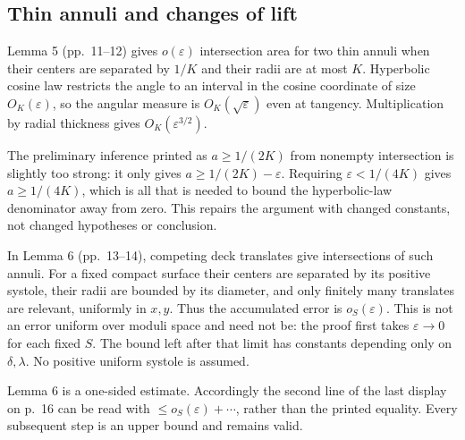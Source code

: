 \documentclass[10pt]{article}
\begin{document}
\subsection*{Thin annuli and changes of lift}
Lemma 5 (pp. 11–12) gives \(o(\varepsilon)\) intersection area for two thin annuli when their centers are separated by \(1/K\) and their radii are at most \(K\). Hyperbolic cosine law restricts the angle to an interval in the cosine coordinate of size \(O_K(\varepsilon)\), so the angular measure is \(O_K(\sqrt\varepsilon)\) even at tangency. Multiplication by radial thickness gives \(O_K(\varepsilon^{3/2})\).\par
The preliminary inference printed as \(a\geq1/(2K)\) from nonempty intersection is slightly too strong: it only gives \(a\geq1/(2K)-\varepsilon\). Requiring \(\varepsilon<1/(4K)\) gives \(a\geq1/(4K)\), which is all that is needed to bound the hyperbolic-law denominator away from zero. This repairs the argument with changed constants, not changed hypotheses or conclusion.\par
In Lemma 6 (pp. 13–14), competing deck translates give intersections of such annuli. For a fixed compact surface their centers are separated by its positive systole, their radii are bounded by its diameter, and only finitely many translates are relevant, uniformly in \(x,y\). Thus the accumulated error is \(o_S(\varepsilon)\). This is not an error uniform over moduli space and need not be: the proof first takes \(\varepsilon\to0\) for each fixed \(S\). The bound left after that limit has constants depending only on \(\delta,\lambda\). No positive uniform systole is assumed.\par
Lemma 6 is a one-sided estimate. Accordingly the second line of the last display on p. 16 can be read with \(\leq o_S(\varepsilon)+\cdots\), rather than the printed equality. Every subsequent step is an upper bound and remains valid.\par
\end{document}
